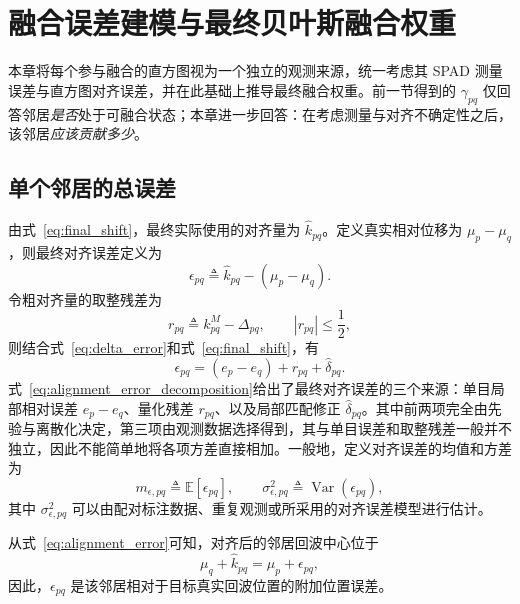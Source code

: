 \documentclass[11pt,a4paper]{ctexart}
\numberwithin{equation}{section}
\newcommand{\E}{\mathbb{E}}
\newcommand{\Var}{\operatorname{Var}}
\begin{document}
\section{融合误差建模与最终贝叶斯融合权重}
\label{sec:fusion_weight}

本章将每个参与融合的直方图视为一个独立的观测来源，统一考虑其 SPAD 测量误差与直方图对齐误差，并在此基础上推导最终融合权重。前一节得到的 $\gamma_{pq}$ 仅回答邻居\emph{是否}处于可融合状态；本章进一步回答：在考虑测量与对齐不确定性之后，该邻居\emph{应该贡献多少}。

\subsection{单个邻居的总误差}

由式~\eqref{eq:final_shift}，最终实际使用的对齐量为 $\hat k_{pq}$。定义真实相对位移为 $\mu_p-\mu_q$，则最终对齐误差定义为
\begin{equation}
    \epsilon_{pq}
    \triangleq
    \hat k_{pq}-(\mu_p-\mu_q).
    \label{eq:alignment_error}
\end{equation}
令粗对齐量的取整残差为
\begin{equation}
    r_{pq}
    \triangleq
    k_{pq}^{M}-\Delta_{pq},
    \qquad
    |r_{pq}|\leq\frac12,
    \label{eq:quantization_error}
\end{equation}
则结合式~\eqref{eq:delta_error}和式~\eqref{eq:final_shift}，有
\begin{equation}
    \boxed{
    \epsilon_{pq}
    =
    (e_p-e_q)+r_{pq}+\hat\delta_{pq}
    }.
    \label{eq:alignment_error_decomposition}
\end{equation}
式~\eqref{eq:alignment_error_decomposition}给出了最终对齐误差的三个来源：单目局部相对误差 $e_p-e_q$、量化残差 $r_{pq}$、以及局部匹配修正 $\hat\delta_{pq}$。其中前两项完全由先验与离散化决定，第三项由观测数据选择得到，其与单目误差和取整残差一般并不独立，因此不能简单地将各项方差直接相加。一般地，定义对齐误差的均值和方差为
\begin{equation}
    m_{\epsilon,pq}
    \triangleq
    \E[\epsilon_{pq}],
    \qquad
    \sigma_{\epsilon,pq}^{2}
    \triangleq
    \Var(\epsilon_{pq}),
    \label{eq:alignment_moments}
\end{equation}
其中 $\sigma_{\epsilon,pq}^{2}$ 可以由配对标注数据、重复观测或所采用的对齐误差模型进行估计。

从式~\eqref{eq:alignment_error}可知，对齐后的邻居回波中心位于
\begin{equation}
    \mu_q+\hat k_{pq}
    =
    \mu_p+\epsilon_{pq},
    \label{eq:aligned_center}
\end{equation}
因此，$\epsilon_{pq}$ 是该邻居相对于目标真实回波位置的附加位置误差。
\end{document}
